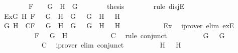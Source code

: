 \begin{isabellebody}
\ \ \ \ \ \ \ \ F\ {\isacharequal}\ \isactrlbold {\isasymnot}\ {\isacharparenleft}\isactrlbold {\isasymnot}\ G{\isacharparenright}\ {\isasymand}\ H\ {\isacharequal}\ G{\isachardoublequoteclose}\isanewline
\ \ \ \ \ \ \isamarkupfalse%
\ {\isacharquery}thesis\isanewline
\ \ \ \ \ \ \isamarkupfalse%
\ {\isacharparenleft}rule\ disjE{\isacharparenright}\isanewline
\ \ \ \ \ \ \ \ \isamarkupfalse%
\ Ex{}{\isacharcolon}{\isachardoublequoteopen}{\isasymexists}G{}\ H{}{\isachardot}\ F\ {\isacharequal}\ \isactrlbold {\isasymnot}\ {\isacharparenleft}G{}\ \isactrlbold {\isasymand}\ H{}{\isacharparenright}\ {\isasymand}\ G\ {\isacharequal}\ \isactrlbold {\isasymnot}\ G{}\ {\isasymand}\ H\ {\isacharequal}\ \isactrlbold {\isasymnot}\ H{}{\isachardoublequoteclose}\isanewline
\ \ \ \ \ \ \ \ \isamarkupfalse%
\ G{}\ H{}\ \ C{}{\isacharcolon}{\isachardoublequoteopen}F\ {\isacharequal}\ \isactrlbold {\isasymnot}\ {\isacharparenleft}G{}\ \isactrlbold {\isasymand}\ H{}{\isacharparenright}\ {\isasymand}\ G\ {\isacharequal}\ \isactrlbold {\isasymnot}\ G{}\ {\isasymand}\ H\ {\isacharequal}\ \isactrlbold {\isasymnot}\ H{}{\isachardoublequoteclose}\isanewline
\ \ \ \ \ \ \ \ \ \ \isamarkupfalse%
\ Ex{}\ \isamarkupfalse%
\ {\isacharparenleft}iprover\ elim{\isacharcolon}\ exE{\isacharparenright}\isanewline
\ \ \ \ \ \ \ \ \isamarkupfalse%
\ {\isachardoublequoteopen}F\ {\isacharequal}\ \isactrlbold {\isasymnot}\ {\isacharparenleft}G{}\ \isactrlbold {\isasymand}\ H{}{\isacharparenright}{\isachardoublequoteclose}\isanewline
\ \ \ \ \ \ \ \ \ \ \isamarkupfalse%
\ C{}\ \isamarkupfalse%
\ {\isacharparenleft}rule\ conjunct{}{\isacharparenright}\isanewline
\ \ \ \ \ \ \ \ \isamarkupfalse%
\ {\isachardoublequoteopen}G\ {\isacharequal}\ \isactrlbold {\isasymnot}\ G{}{\isachardoublequoteclose}\isanewline
\ \ \ \ \ \ \ \ \ \ \isamarkupfalse%
\ C{}\ \isamarkupfalse%
\ {\isacharparenleft}iprover\ elim{\isacharcolon}\ conjunct{}{\isacharparenright}\isanewline
\ \ \ \ \ \ \ \ \isamarkupfalse%
\ {\isachardoublequoteopen}H\ {\isacharequal}\ \isactrlbold {\isasymnot}\ H{}{\isachardoublequoteclose}\isanewline

\end{isabellebody}
